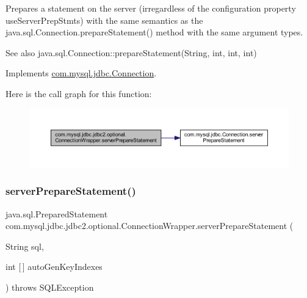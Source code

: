 Prepares a statement on the server (irregardless of the configuration property \textquotesingle{}use\+Server\+Prep\+Stmts\textquotesingle{}) with the same semantics as the java.\+sql.\+Connection.\+prepare\+Statement() method with the same argument types.

\begin{DoxySeeAlso}{See also}
java.\+sql.\+Connection\+::prepare\+Statement(\+String, int, int, int) 
\end{DoxySeeAlso}


Implements \mbox{\hyperlink{interfacecom_1_1mysql_1_1jdbc_1_1_connection_aa815a139c20cb2ecb32bc50fca219c6e}{com.\+mysql.\+jdbc.\+Connection}}.

Here is the call graph for this function\+:
\nopagebreak
\begin{figure}[H]
\begin{center}
\leavevmode
\includegraphics[width=350pt]{classcom_1_1mysql_1_1jdbc_1_1jdbc2_1_1optional_1_1_connection_wrapper_aa5144167983b1257bdf575d8349e1fbe_cgraph}
\end{center}
\end{figure}
\mbox{\label{classcom_1_1mysql_1_1jdbc_1_1jdbc2_1_1optional_1_1_connection_wrapper_a4625dbf11fc977f96a2da25c00c2a396}} 
\subsubsection{\texorpdfstring{server\+Prepare\+Statement()}{serverPrepareStatement()}\hspace{0.1cm}{\footnotesize\ttfamily [5/6]}}
{\footnotesize\ttfamily java.\+sql.\+Prepared\+Statement com.\+mysql.\+jdbc.\+jdbc2.\+optional.\+Connection\+Wrapper.\+server\+Prepare\+Statement (\begin{DoxyParamCaption}\item[{String}]{sql,  }\item[{int \mbox{[}$\,$\mbox{]}}]{auto\+Gen\+Key\+Indexes }\end{DoxyParamCaption}) throws S\+Q\+L\+Exception}

